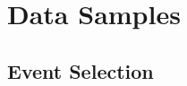 \section{Data Samples}\label{sec:DataSamples}





\subsection{Event Selection}\label{sec:EventSelection}
